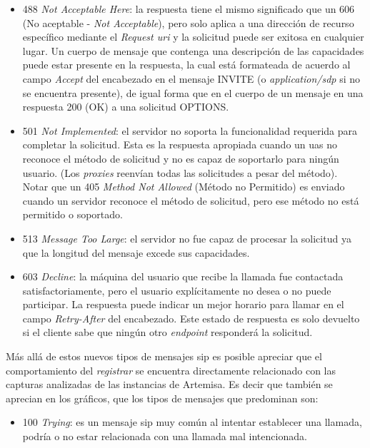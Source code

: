 \documentclass[a4paper,12pt]{report}
\begin{document}
{\begin{itemize}
\item 488 \emph{Not Acceptable Here}: la respuesta tiene el mismo significado que
un 606 (No aceptable - \emph{Not Acceptable}), pero solo aplica a una dirección
de recurso específico mediante el \emph{Request \ac{uri}} y la solicitud puede ser
exitosa en cualquier lugar. Un cuerpo de mensaje que contenga una descripción
de las capacidades puede estar presente en la respuesta, la cual está
formateada de acuerdo al campo \emph{Accept} del encabezado en el mensaje
INVITE (o \emph{application/\ac{sdp}} si no se encuentra presente), de igual forma
que en el cuerpo de un mensaje en una respuesta 200 (OK) a una solicitud
OPTIONS.

\item 501 \emph{Not Implemented}: el servidor no soporta la funcionalidad requerida
para completar la solicitud. Esta es la respuesta apropiada cuando un \ac{uas} no 
reconoce el método de solicitud y no es capaz de soportarlo para ningún usuario.
(Los \emph{proxies} reenvían todas las solicitudes a pesar del método).
Notar que un 405 \emph{Method Not Allowed} (Método no Permitido) es enviado cuando
un servidor reconoce el método de solicitud, pero ese método no está permitido o soportado.

\item 513 \emph{Message Too Large}: el servidor no fue capaz de procesar la
solicitud ya que la longitud del mensaje excede sus capacidades.

\item 603 \emph{Decline}: la máquina del usuario que recibe la llamada fue
contactada satisfactoriamente, pero el usuario explícitamente no desea o no
puede participar. La respuesta puede indicar un mejor horario para llamar en el
campo \emph{Retry-After} del encabezado. Este estado de respuesta es solo
devuelto si el cliente sabe que ningún otro \emph{endpoint} responderá la
solicitud.\\
\end{itemize}

Más allá de estos nuevos tipos de mensajes \ac{sip} es posible apreciar que el
comportamiento del \emph{registrar} se encuentra directamente relacionado con las
capturas analizadas de las instancias de Artemisa.
Es decir que también se aprecian en los gráficos, que los tipos de mensajes que
predominan son:

\begin{itemize}
\item 100 \emph{Trying}: es un mensaje \ac{sip} muy común al intentar establecer una
llamada, podría o no estar relacionada con una llamada mal intencionada.\\


\end{itemize}}
\end{document}
